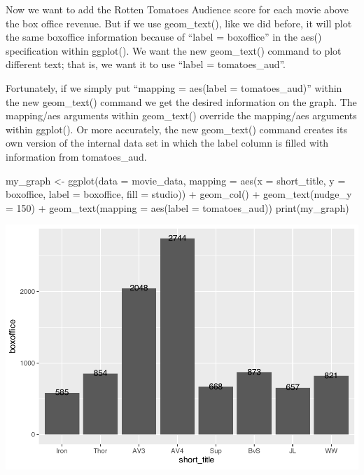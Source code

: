 \documentclass[
]{krantz}
\makeatletter
\newenvironment{Shaded}{\begin{snugshade}}{\end{snugshade}}
\newcommand{\AttributeTok}[1]{\textcolor[rgb]{0.61,0.61,0.61}{#1}}
\newcommand{\DecValTok}[1]{\textcolor[rgb]{0.06,0.06,0.06}{#1}}
\newcommand{\FunctionTok}[1]{\textcolor[rgb]{0,0,0}{#1}}
\newcommand{\NormalTok}[1]{#1}
\newcommand{\OtherTok}[1]{\textcolor[rgb]{0.37,0.37,0.37}{#1}}
\newcommand{\SpecialCharTok}[1]{\textcolor[rgb]{0,0,0}{#1}}
\newenvironment{kframe}{%
\medskip{}
\setlength{\fboxsep}{.8em}
 \def\at@end@of@kframe{}%
 \ifinner\ifhmode%
  \def\at@end@of@kframe{\end{minipage}}%
  \begin{minipage}{\columnwidth}%
 \fi\fi%
 \def\FrameCommand##1{\hskip\@totalleftmargin \hskip-\fboxsep
 \colorbox{shadecolor}{##1}\hskip-\fboxsep
     \hskip-\linewidth \hskip-\@totalleftmargin \hskip\columnwidth}%
 \MakeFramed {\advance\hsize-\width
   \@totalleftmargin\z@ \linewidth\hsize
   \@setminipage}}%
 {\par\unskip\endMakeFramed%
 \at@end@of@kframe}
\renewenvironment{Shaded}{\begin{kframe}}{\end{kframe}}
\makeatother
\begin{document}
Now we want to add the Rotten Tomatoes Audience score for each movie above the box office revenue. But if we use geom\_text(), like we did before, it will plot the same boxoffice information because of ``label = boxoffice'' in the aes() specification within ggplot(). We want the new geom\_text() command to plot different text; that is, we want it to use ``label = tomatoes\_aud''.

Fortunately, if we simply put ``mapping = aes(label = tomatoes\_aud)'' within the new geom\_text() command we get the desired information on the graph. The mapping/aes arguments within geom\_text() override the mapping/aes arguments within ggplot(). Or more accurately, the new geom\_text() command creates its own version of the internal data set in which the label column is filled with information from tomatoes\_aud.

\begin{Shaded}
\begin{Highlighting}[]
\NormalTok{my\_graph }\OtherTok{\textless{}{-}} \FunctionTok{ggplot}\NormalTok{(}\AttributeTok{data =}\NormalTok{ movie\_data,}
           \AttributeTok{mapping =} \FunctionTok{aes}\NormalTok{(}\AttributeTok{x =}\NormalTok{ short\_title,}
                         \AttributeTok{y =}\NormalTok{ boxoffice,}
                         \AttributeTok{label =}\NormalTok{ boxoffice, }
                         \AttributeTok{fill =}\NormalTok{ studio)) }\SpecialCharTok{+}
  \FunctionTok{geom\_col}\NormalTok{() }\SpecialCharTok{+}
  \FunctionTok{geom\_text}\NormalTok{(}\AttributeTok{nudge\_y =} \DecValTok{150}\NormalTok{)  }\SpecialCharTok{+}
  \FunctionTok{geom\_text}\NormalTok{(}\AttributeTok{mapping =} \FunctionTok{aes}\NormalTok{(}\AttributeTok{label =}\NormalTok{ tomatoes\_aud)) }
\FunctionTok{print}\NormalTok{(my\_graph)}
\end{Highlighting}
\end{Shaded}

\includegraphics[width=0.65\linewidth]{bookdown_files/figure-latex/unnamed-chunk-111-1}
\end{document}
